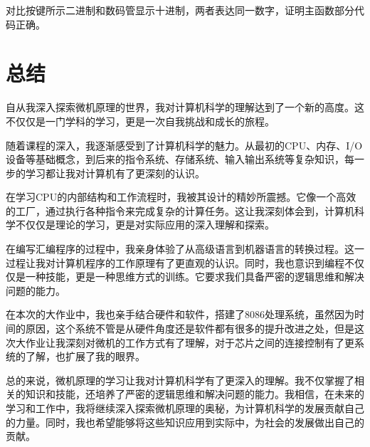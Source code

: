 \documentclass{ctexart}
\begin{document}
			对比按键所示二进制和数码管显示十进制，两者表达同一数字，证明主函数部分代码正确。
	\newpage
	\section{总结}
		自从我深入探索微机原理的世界，我对计算机科学的理解达到了一个新的高度。这不仅仅是一门学科的学习，更是一次自我挑战和成长的旅程。
		
		随着课程的深入，我逐渐感受到了计算机科学的魅力。从最初的CPU、内存、I/O设备等基础概念，到后来的指令系统、存储系统、输入输出系统等复杂知识，每一步的学习都让我对计算机有了更深刻的认识。
		
		在学习CPU的内部结构和工作流程时，我被其设计的精妙所震撼。它像一个高效的工厂，通过执行各种指令来完成复杂的计算任务。这让我深刻体会到，计算机科学不仅仅是理论的学习，更是对实际应用的深入理解和探索。
		
		在编写汇编程序的过程中，我亲身体验了从高级语言到机器语言的转换过程。这一过程让我对计算机程序的工作原理有了更直观的认识。同时，我也意识到编程不仅仅是一种技能，更是一种思维方式的训练。它要求我们具备严密的逻辑思维和解决问题的能力。
		
		在本次的大作业中，我也亲手结合硬件和软件，搭建了8086处理系统，虽然因为时间的原因，这个系统不管是从硬件角度还是软件都有很多的提升改进之处，但是这次大作业让我深刻对微机的工作方式有了理解，对于芯片之间的连接控制有了更系统的了解，也扩展了我的眼界。
		
		总的来说，微机原理的学习让我对计算机科学有了更深入的理解。我不仅掌握了相关的知识和技能，还培养了严密的逻辑思维和解决问题的能力。我相信，在未来的学习和工作中，我将继续深入探索微机原理的奥秘，为计算机科学的发展贡献自己的力量。同时，我也希望能够将这些知识应用到实际中，为社会的发展做出自己的贡献。
			
    \newpage
	
	\newpage
	
\end{document}
